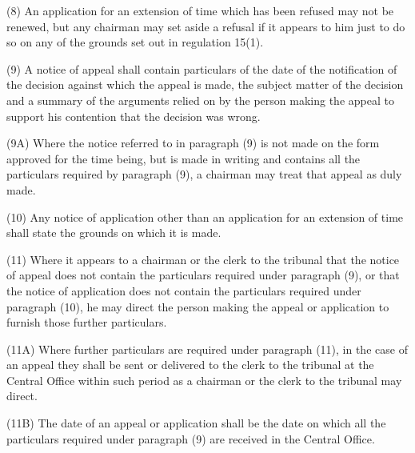 \documentclass[a4paper]{article}
\begin{document}
(8) An application for an extension of time which has been refused may not be renewed, but any chairman may set aside a refusal if it appears to him just to do so on any of the grounds set out in regulation 15(1).


(9) A notice of appeal shall contain particulars of the date of the notification of the decision against which the appeal is made, the subject matter of the decision and a summary of the arguments relied on by the person making the appeal to support his contention that the decision was wrong.

(9A) Where the notice referred to in paragraph (9) is not made on the form approved for the time being, but is made in writing and contains all the particulars required by paragraph (9), a chairman may treat that appeal as duly made.

(10) Any notice of 
application other than an application for an extension of time shall state the grounds on which it is made.


(11) Where it appears to a chairman or the clerk to the tribunal that the notice of appeal does not contain the particulars required under paragraph (9), or that the notice of application does not contain the particulars required under paragraph (10), he may direct the person making the appeal or application to furnish those further particulars.

(11A) Where further particulars are required under paragraph (11), in the case of an appeal they shall be sent or delivered to the clerk to the tribunal at the Central Office within such period as a chairman or the clerk to the tribunal may direct.

(11B) The date of an appeal or application shall be the date on which all the particulars required under paragraph (9) are received in the Central Office.
\end{document}
